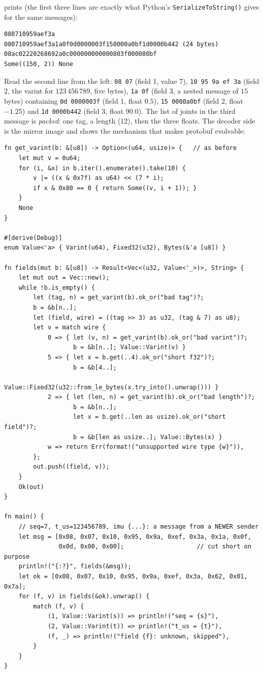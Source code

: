 prints (the first three lines are exactly what Python's \verb!SerializeToString()! gives for the same messages):
\begin{verbatim}
080710959aef3a
080710959aef3a1a0f0d0000003f150000a0bf1d0000b442 (24 bytes)
08ac02220268692a0c000000000000803f000080bf
Some((150, 2)) None
\end{verbatim}
Read the second line from the left: \verb!08 07! (field 1, value $7$), \verb!10 95 9a ef 3a! (field 2, the varint for $123\,456\,789$, five bytes), \verb!1a 0f! (field 3, a nested message of $15$ bytes) containing \verb!0d 0000003f! (field 1, float $0.5$), \verb!15 0000a0bf! (field 2, float $-1.25$) and \verb!1d 0000b442! (field 3, float $90.0$). The list of joints in the third message is \emph{packed}: one tag, a length ($12$), then the three floats. The decoder side is the mirror image and shows the mechanism that makes protobuf evolvable:
\begin{verbatim}
fn get_varint(b: &[u8]) -> Option<(u64, usize)> {   // as before
    let mut v = 0u64;
    for (i, &x) in b.iter().enumerate().take(10) {
        v |= ((x & 0x7f) as u64) << (7 * i);
        if x & 0x80 == 0 { return Some((v, i + 1)); }
    }
    None
}

#[derive(Debug)]
enum Value<'a> { Varint(u64), Fixed32(u32), Bytes(&'a [u8]) }

fn fields(mut b: &[u8]) -> Result<Vec<(u32, Value<'_>)>, String> {
    let mut out = Vec::new();
    while !b.is_empty() {
        let (tag, n) = get_varint(b).ok_or("bad tag")?;
        b = &b[n..];
        let (field, wire) = ((tag >> 3) as u32, (tag & 7) as u8);
        let v = match wire {
            0 => { let (v, n) = get_varint(b).ok_or("bad varint")?;
                   b = &b[n..]; Value::Varint(v) }
            5 => { let x = b.get(..4).ok_or("short f32")?;
                   b = &b[4..];
                   Value::Fixed32(u32::from_le_bytes(x.try_into().unwrap())) }
            2 => { let (len, n) = get_varint(b).ok_or("bad length")?;
                   b = &b[n..];
                   let x = b.get(..len as usize).ok_or("short field")?;
                   b = &b[len as usize..]; Value::Bytes(x) }
            w => return Err(format!("unsupported wire type {w}")),
        };
        out.push((field, v));
    }
    Ok(out)
}

fn main() {
    // seq=7, t_us=123456789, imu {...}: a message from a NEWER sender
    let msg = [0x08, 0x07, 0x10, 0x95, 0x9a, 0xef, 0x3a, 0x1a, 0x0f,
               0x0d, 0x00, 0x00];                    // cut short on purpose
    println!("{:?}", fields(&msg));
    let ok = [0x08, 0x07, 0x10, 0x95, 0x9a, 0xef, 0x3a, 0x62, 0x01, 0x7a];
    for (f, v) in fields(&ok).unwrap() {
        match (f, v) {
            (1, Value::Varint(s)) => println!("seq = {s}"),
            (2, Value::Varint(t)) => println!("t_us = {t}"),
            (f, _) => println!("field {f}: unknown, skipped"),
        }
    }
}
\end{verbatim}
